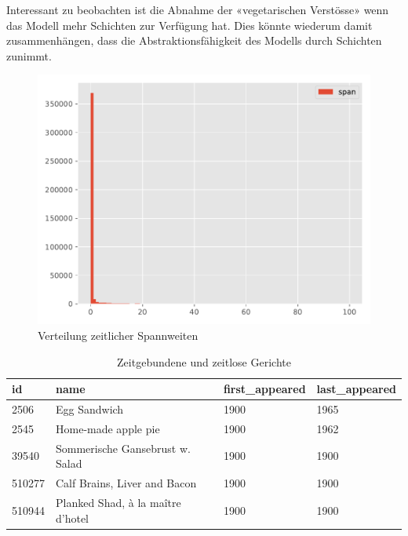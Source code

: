 Interessant zu beobachten ist die Abnahme der «vegetarischen Verstösse» wenn das Modell mehr Schichten zur Verfügung hat.
Dies könnte wiederum damit zusammenhängen, dass die Abstraktionsfähigkeit des Modells durch Schichten zunimmt.

\begin{figure}
    \centering
    \includegraphics[width=0.75\linewidth]{images/analysis/histogram-datespans.pdf}
    \caption{Verteilung zeitlicher Spannweiten}
    \label{fig:hist-dates-datespans}
\end{figure}



\begin{center}
    \begin{table}
        \centering
        \small
        \begin{tabular}{ |l|l|l|l| }

            \hline
            \textbf{id} & \textbf{name} & \textbf{first\_appeared} & \textbf{last\_appeared} \\
            \hline
            2506 & Egg Sandwich & 1900 & 1965 \\
            2545 & Home-made apple pie & 1900 & 1962 \\
            39540 & Sommerische Gansebrust w. Salad & 1900 & 1900 \\
            510277 & Calf Brains, Liver and Bacon & 1900 & 1900 \\
            510944 & Planked Shad, à la maître d'hotel & 1900 & 1900 \\
            \hline
        \end{tabular} \\

        \caption{Zeitgebundene und zeitlose Gerichte}
        \label{tab:data-1900}
    \end{table}
\end{center}


